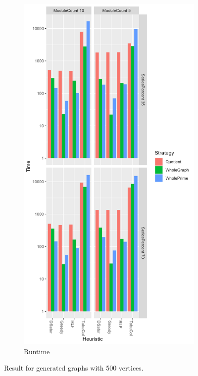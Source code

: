 \documentclass[a4paper]{article}
\begin{document}
\begin{figure}[p]
\begin{subfigure}{.4\paperwidth}
    \end{subfigure}%
    \begin{subfigure}{.4\paperwidth}
        \includegraphics[width=\columnwidth]{Tables/500Time.png}
      \caption{Runtime}
      \label{fig:500t}
    \end{subfigure}
\caption{Result for generated graphs with 500 vertices. \facfigdesc}
\label{fig:500}
\end{figure}
\end{document}

